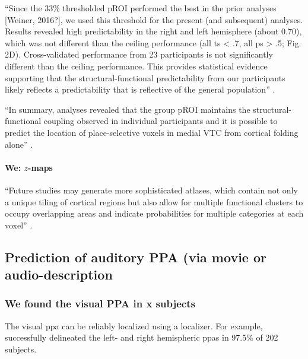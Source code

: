 ``Since the 33\% thresholded pROI performed the best in the prior analyses
[Weiner, 2016?], we used this threshold for the present (and subsequent)
analyses.
%
Results revealed high predictability in the right and left hemisphere (about
0.70), which was not different than the ceiling performance (all ts < .7, all ps
> .5; Fig. 2D).
%
Cross-validated performance from 23 participants is not significantly different
than the ceiling performance.
%
This provides statistical evidence supporting that the structural-functional
predictability from our participants likely reflects a predictability that is
reflective of the general population'' \citep{weiner2018defining}.

``In summary, analyses revealed that the group pROI maintains the
structural-functional coupling observed in individual participants and it is
possible to predict the location of place-selective voxels in medial VTC from
cortical folding alone'' \citep{weiner2018defining}.


\paragraph{We: $z$-maps}



``Future studies may generate more sophisticated atlases, which contain not only
a unique tiling of cortical regions but also allow for multiple functional
clusters to occupy overlapping areas and indicate probabilities for multiple
categories at each voxel'' \citep{rosenke2021probabilistic}.








\subsection{Prediction of auditory PPA (via movie or audio-description}

\subsubsection{We found the visual PPA in x subjects}

The visual \ac{ppa} can be reliably localized using a localizer.
%
For example, \citet{zhen2017quantifying} successfully delineated the left- and
right hemispheric \acp{ppa} in 97.5\% of 202 subjects.

